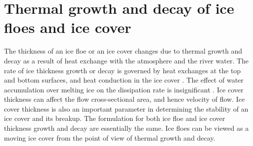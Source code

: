 



\section{Thermal growth and decay of ice floes and ice cover}
\label{section:thermal_growth_icover}

The thickness of an ice floe or an ice cover changes due to thermal growth and decay as a result of heat exchange with the atmosphere and the river water. The rate of ice thickness growth or decay is governed by heat exchanges at the top and bottom surfaces, and heat conduction in the ice cover \cite{Shen&Chiang1984}. The effect of water accumulation over melting ice on the
dissipation rate is insignificant \cite{Wake1979}. Ice cover thickness can affect the flow cross-sectional area, and hence velocity of flow. Ice cover thickness is also an important parameter in determining the stability of an ice cover and its breakup. The formulation for both ice floe and ice cover thickness growth and decay are essentially the same. Ice floes can be viewed as a moving ice cover from the point of view of thermal growth and decay.

